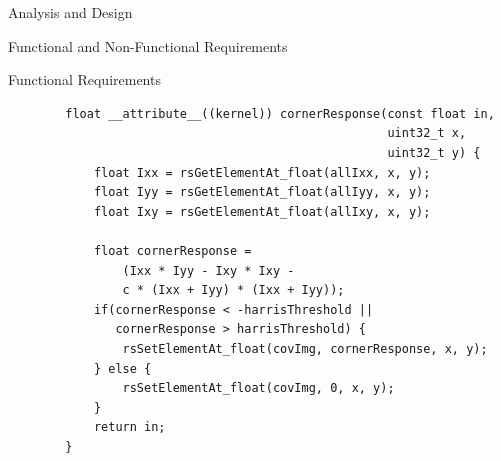 \documentclass[12pt, a4paper]{article} \pagenumbering{gobble}
\begin{document}
\begin{section}{Analysis and Design}
\begin{subsection}{Functional and Non-Functional Requirements}
\begin{subsubsection}{Functional Requirements}
      \newline
      \vspace{1cm}
      \newline
      {\ttfamily
      \begin{lstlisting}
        float __attribute__((kernel)) cornerResponse(const float in,
                                                     uint32_t x,
                                                     uint32_t y) {
            float Ixx = rsGetElementAt_float(allIxx, x, y);
            float Iyy = rsGetElementAt_float(allIyy, x, y);
            float Ixy = rsGetElementAt_float(allIxy, x, y);

            float cornerResponse =
                (Ixx * Iyy - Ixy * Ixy -
                c * (Ixx + Iyy) * (Ixx + Iyy));
            if(cornerResponse < -harrisThreshold ||
               cornerResponse > harrisThreshold) {
                rsSetElementAt_float(covImg, cornerResponse, x, y);
            } else {
                rsSetElementAt_float(covImg, 0, x, y);
            }
            return in;
        }
      \end{lstlisting}
      }


\end{subsubsection}
\end{subsection}
\end{section}
\end{document}

